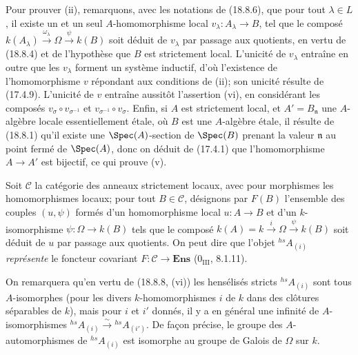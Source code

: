 Pour prouver (ii), remarquons, avec les notations de (18.8.6), que pour tout $\lambda\in L$, il existe un et un seul $A$-homomorphisme local $v_\lambda:A_\lambda\to B$, tel que le composé $k(A_\lambda)\xrightarrow{\omega_\lambda}\Omega\xrightarrow{\psi}k(B)$ soit déduit de $v_\lambda$ par passage aux quotients, en vertu de (18.8.4) et de l'hypothèse que $B$ est strictement local. L'unicité de $v_\lambda$ entraîne en outre que les $v_\lambda$ forment un système inductif, d'où l'existence de l'homomorphisme $v$ répondant aux conditions de (ii); son unicité résulte de (17.4.9). L'unicité de $v$ entraîne aussitôt l'assertion (vi), en considérant les composés $v_\sigma\circ v_{\sigma^{-1}}$ et $v_{\sigma^{-1}}\circ v_\sigma$. Enfin, si $A$ est strictement local, et $A'=B_{\mathfrak n}$ une $A$-algèbre locale essentiellement étale, où $B$ est une $A$-algèbre étale, il résulte de (18.8.1) qu'il existe une $\Spec(A)$-section de $\Spec(B)$ prenant la valeur $\mathfrak n$ au point fermé de $\Spec(A)$, donc on déduit de (17.4.1) que l'homomorphisme $A\to A'$ est bijectif, ce qui prouve (v).

\begin{env}[18.8.8.1]
\label{IV.18.8.8.1}
Soit $\mathcal C$ la catégorie des anneaux strictement locaux, avec pour morphismes les homomorphismes locaux; pour tout $B\in\mathcal C$, désignons par $F(B)$ l'ensemble des couples $(u,\psi)$ formés d'un homomorphisme local $u:A\to B$ et d'un $k$-isomorphisme $\psi:\Omega\to k(B)$ tels que le composé $k(A)=k\xrightarrow{i}\Omega\xrightarrow{\psi}k(B)$ soit déduit de $u$ par passage aux quotients. On peut dire que l'objet ${}^{hs}\!A_{(i)}$ \emph{représente} le foncteur covariant $F:\mathcal C\to\mathbf{Ens}$ ($0_{\mathrm{III}}$, 8.1.11).

On remarquera qu'en vertu de (18.8.8, (vi)) les hensélisés stricts ${}^{hs}\!A_{(i)}$ sont tous $A$-isomorphes (pour les divers $k$-homomorphismes $i$ de $k$ dans des clôtures séparables de $k$), mais pour $i$ et $i'$ donnés, il y a en général une infinité de $A$-isomorphismes ${}^{hs}\!A_{(i)}\xrightarrow{\sim}{}^{hs}\!A_{(i')}$. De façon précise, le groupe des $A$-automorphismes de ${}^{hs}\!A_{(i)}$ est isomorphe au groupe de Galois de $\Omega$ sur $k$.
\end{env}

